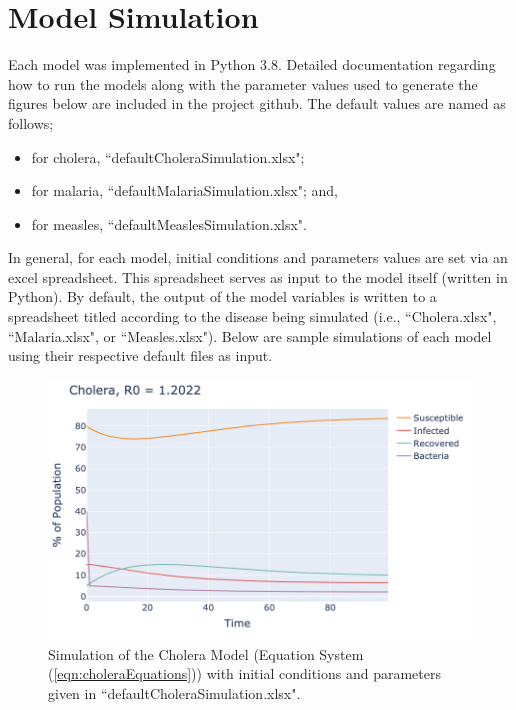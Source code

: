 \documentclass[letter,12pt, usenames,dvipsnames]{article}
\begin{document}
\pagebreak

\section{Model Simulation}
\label{sec:Simulations}
Each model was implemented in Python 3.8.  Detailed documentation regarding how to run the models along with the parameter values used to generate the figures below are included in the project github.  The default values are named as follows; 
\begin{itemize}
    \item for cholera,  ``defaultCholeraSimulation.xlsx";
    \item for malaria, ``defaultMalariaSimulation.xlsx"; and,
    \item for measles, ``defaultMeaslesSimulation.xlsx".
\end{itemize}
In general, for each model, initial conditions and parameters values are set via an excel spreadsheet.  This spreadsheet serves as input to the model itself (written in Python).  By default, the output of the model variables is written to a spreadsheet titled according to the disease being simulated (i.e., ``Cholera.xlsx", ``Malaria.xlsx", or ``Measles.xlsx"). Below are sample simulations of each model using their respective default files as input.

\begin{figure}[h!]
    \centering
    \includegraphics[width = .8\textwidth]{CholeraRun.png}
    \caption{Simulation of the Cholera Model (Equation System (\ref{eqn:choleraEquations})) with initial conditions and parameters given in ``defaultCholeraSimulation.xlsx".}
    \label{fig:my_label}
\end{figure}
\end{document}
